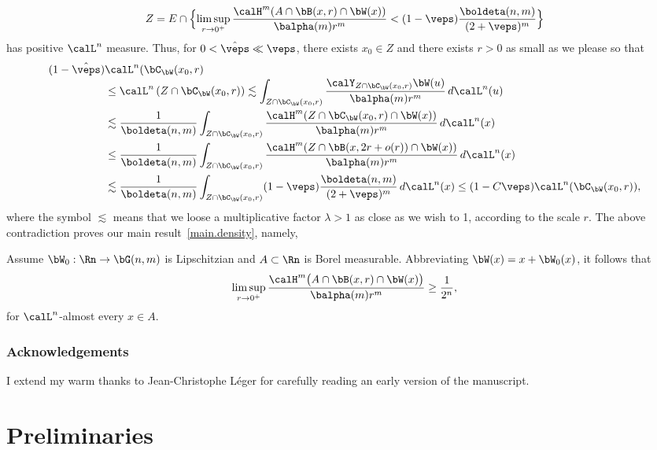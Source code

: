 \begin{equation*}
Z = E \cap \Bigl\{ \limsup_{r \to 0^+} \frac{\calH^m (A \cap \bB(x,r) \cap \bW(x))}{\balpha(m)r^m} < (1-\veps) \frac{\boldeta(n,m)}{(2+\veps)^m} \Bigr\}
\end{equation*}
has positive $\calL^n$ measure.
Thus, for $0 < \hat{\veps} \ll \veps$, there exists $x_0 \in Z$ and there exists $r > 0$ as small as we please so that\vspace*{-3pt}
\begin{align*}
(1 - \hat{\veps})& \calL^n (\bC_\bW(x_0,r)\\[-3pt]
&\leq \calL^n \left(Z \cap \bC_\bW(x_0,r) \right) \lesssim \int_{Z \cap \bC_\bW(x_0,r)} \frac{\calY_{Z \cap \bC_\bW(x_0,r)} \bW(u)}{\balpha(m)r^m} \,d\calL^n(u) \\
&\lesssim \frac{1}{\boldeta(n,m)} \int_{Z \cap \bC_\bW(x_0,r)} \frac{\calH^m(Z \cap \bC_\bW(x_0,r) \cap \bW(x))}{\balpha(m)r^m} \,d\calL^n(x)\\
&\leq \frac{1}{\boldeta(n,m)} \int_{Z \cap \bC_\bW(x_0,r)} \frac{\calH^m(Z \cap \bB(x,2r+o(r)) \cap \bW(x))}{\balpha(m)r^m} \,d\calL^n(x) \\
&\lesssim \frac{1}{\boldeta(n,m)} \int_{Z \cap \bC_\bW(x_0,r)} (1-\veps) \frac{\boldeta(n,m)}{(2+\veps)^m} \,d\calL^n(x) \leq (1-C\veps) \calL^n(\bC_\bW(x_0,r)),
\end{align*}
where the symbol $\lesssim$ means that we loose a multiplicative factor $\lambda > 1$ as close as we wish to 1, according to the scale $r$.
The above contradiction proves our main result~\ref{main.density}, namely,
\begin{Theorem*}
Assume $\bW_0: \Rn \to \bG(n,m)$ is Lipschitzian and $A \subset \Rn$ is Borel measurable. Abbreviating $\bW(x) = x + \bW_0(x)$, it follows that
\begin{equation*}
\limsup_{r \to 0^+} \frac{\calH^m \big(A \cap \bB(x,r) \cap \bW(x) \big)}{\balpha(m)r^m} \geq \frac{1}{2^n},
\end{equation*}
for $\calL^n$-almost every $x \in A$.
\end{Theorem*}

\subsubsection*{Acknowledgements}
I extend my warm thanks to Jean-Christophe Léger for carefully reading an early version of the manuscript.

\section{Preliminaries}

